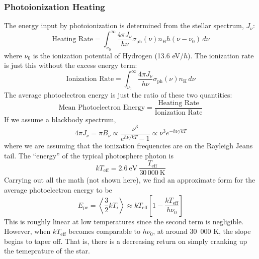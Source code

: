 \documentclass[10pt]{article}
\numberwithin{equation}{section}
\newcommand{\avg}[1]{\left\langle#1\right\rangle}
\begin{document}
\subsubsection{Photoionization Heating} %
\label{sub:photoionization_heating}
The energy input by photoionization is determined from the stellar spectrum,
$J_\nu$:
\begin{equation}
  \label{eq:h2:4}\textrm{Heating Rate} = \int_{\nu_0}^\infty \frac{4\pi
  J_\nu}{h\nu}\sigma_{\mathrm{ph}}(\nu)n_{\mathrm{H}}h(\nu - \nu_0)\,d\nu
\end{equation}
where $\nu_0$ is the ionization potential of Hydrogen (13.6 eV/$h$). The
ionization rate is just this without the excess energy term:
\begin{equation}
  \label{eq:h2:5}\textrm{Ionization Rate} = \int_{\nu_0}^\infty \frac{4\pi
  J_\nu}{h\nu}\sigma_{\mathrm{ph}}(\nu)n_{\mathrm{H}}\,d\nu
\end{equation}
The average photoelectron energy is just the ratio of these two quantities:
\begin{equation}
  \label{eq:h2:6}\textrm{Mean Photoelectron Energy} = \frac{\textrm{Heating
  Rate}}{\textrm{Ionization Rate}}
\end{equation}
If we assume a blackbody spectrum,
\begin{equation}
  \label{eq:h2:7} 4\pi J_\nu = \pi B_\nu\propto \frac{\nu^3}{e^{h\nu/kT} - 1}
  \propto \nu^3 e^{-h\nu/kT}
\end{equation}
where we are assuming that the ionization frequencies are on the Rayleigh Jeans
tail. The ``energy'' of the typical photosphere photon is
\begin{equation}
  \label{eq:h2:8} kT_{\mathrm{eff}} = 2.6\ \mathrm{eV}\
  \frac{T_{\mathrm{eff}}}{30\,000\ \mathrm{K}}
\end{equation}
Carrying out all the math (not shown here), we find an approximate form for the
average photoelectron energy to be
\begin{equation}
  \label{eq:h2:9} E_{\mathrm{pe}}=\avg{\frac{3}{2}kT_i}\approx
  kT_{\mathrm{eff}}\left[1-\frac{kT_{\mathrm{eff}}}{h\nu_0}\right]
\end{equation}
This is roughly linear at low temperatures since the second term is negligible.
However, when $kT_{\mathrm{eff}}$ becomes comparable to $h\nu_0$, at around 30\
000 K, the slope begins to taper off. That is, there is a decreasing return on
simply cranking up the temeprature of the star.\\
\end{document}
